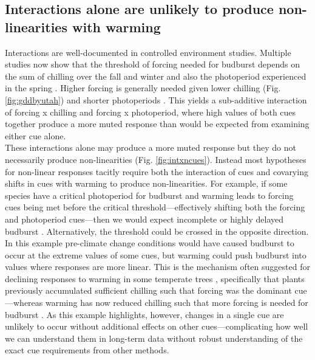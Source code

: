 \documentclass[11pt,letter]{article}
\begin{document}
\subsection{Interactions alone are unlikely to produce non-linearities with warming}
Interactions are well-documented in controlled environment studies. Multiple studies now show that the threshold of forcing needed for budburst depends on the sum of chilling over the fall and winter and also the photoperiod experienced in the spring \citep[e.g.,][]{zohner2014,flynn2018}. Higher forcing is generally needed given lower chilling (Fig. \ref{fig:gddbyutah}) and shorter photoperiods \citep{Basler:2014aa,fu2019}. This yields a sub-additive interaction of forcing x chilling and forcing x photoperiod, where high values of both cues together produce a more muted response than would be expected from examining either cue alone.\\

These interactions alone may produce a more muted response but they do not necessarily produce non-linearities (Fig. \ref{fig:intxncues}). Instead most hypotheses for non-linear responses tacitly require both the interaction of cues and covarying shifts in cues with warming to produce non-linearities. For example, if some species have a critical photoperiod for budburst and warming leads to forcing cues being met before the critical threshold---effectively shifting both the forcing and photoperiod cues---then we would expect incomplete or highly delayed budburst \citep{Singh:2017,rinne2018}. Alternatively, the threshold could be crossed in the opposite direction. In this example pre-climate change conditions would have caused budburst to occur at the extreme values of some cues, but warming could push budburst into values where responses are more linear.  This is the mechanism often suggested for declining responses to warming in some temperate trees \citep{fu2015,piao2017,gauzere2019}, specifically that plants previously accumulated sufficient chilling such that forcing was the dominant cue---whereas warming has now reduced chilling such that more forcing is needed for budburst \citep[producing an overall muted effect when estimated as change in days per $\degree$C, see][for one example]{fu2015}. As this example highlights, however, changes in a single cue are unlikely to occur without additional effects on other cues---complicating how well we can understand them in long-term data without robust understanding of the exact cue requirements from other methods.

\end{document}
